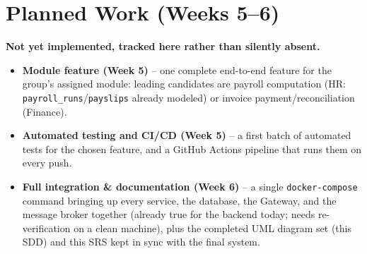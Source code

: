 \documentclass[11pt,a4paper]{report}
\begin{document}
\chapter{Planned Work (Weeks 5--6)}

\begin{futurebox}
\textbf{Not yet implemented, tracked here rather than silently absent.}
\end{futurebox}

\begin{itemize}[leftmargin=1.4em]
  \item \textbf{Module feature (Week 5)} -- one complete end-to-end feature for the group's assigned module: leading candidates are payroll computation (HR: \texttt{payroll\_runs}/\texttt{payslips} already modeled) or invoice payment/reconciliation (Finance).
  \item \textbf{Automated testing and CI/CD (Week 5)} -- a first batch of automated tests for the chosen feature, and a GitHub Actions pipeline that runs them on every push.
  \item \textbf{Full integration \& documentation (Week 6)} -- a single \texttt{docker-compose} command bringing up every service, the database, the Gateway, and the message broker together (already true for the backend today; needs re-verification on a clean machine), plus the completed UML diagram set (this SDD) and this SRS kept in sync with the final system.
\end{itemize}
\end{document}
